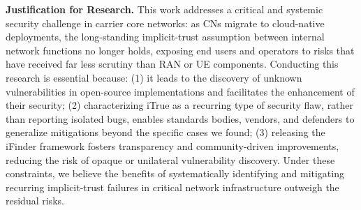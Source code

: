\begin{table}[!t]
  \centering
  \caption{Coordinated-disclosure status per open-source implementation.}
  \label{tab:disclosure-status}
\end{table}

\noindent\textbf{Justification for Research.} This work addresses a critical and systemic security challenge in carrier core networks: as CNs migrate to cloud-native deployments, the long-standing implicit-trust assumption between internal network functions no longer holds, exposing end users and operators to risks that have received far less scrutiny than RAN or UE components. 
Conducting this research is essential because: (1) it leads to the discovery of unknown vulnerabilities in open-source implementations and facilitates the enhancement of their security; (2) characterizing iTrue as a recurring type of security flaw, rather than reporting isolated bugs, enables standards bodies, vendors, and defenders to generalize mitigations beyond the specific cases we found; 
(3) releasing the iFinder framework fosters transparency and community-driven improvements, reducing the risk of opaque or unilateral vulnerability discovery. 
Under these constraints, we believe the benefits of systematically identifying and mitigating recurring implicit-trust failures in critical network infrastructure outweigh the residual risks.
